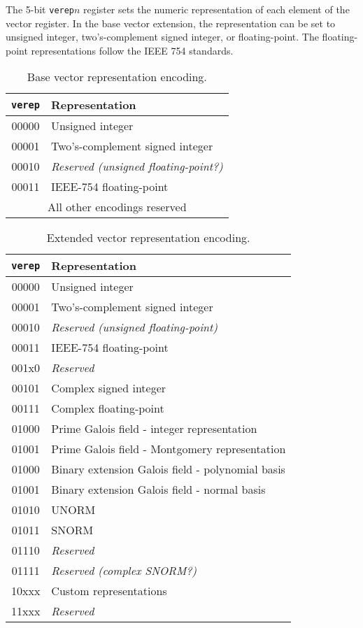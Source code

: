 The 5-bit {\tt verep}$n$ register sets the numeric representation of
each element of the vector register.  In the base vector
extension, the representation can be set to unsigned integer,
two's-complement signed integer, or floating-point.  The
floating-point representations follow the IEEE 754 standards.

\begin{table}[hbtp]
  \centering
  \begin{tabular}{|c|l|}
    \hline
    {\tt verep} & Representation \\
    \hline
    00000 & Unsigned integer \\
    00001 & Two's-complement signed integer \\
    00010 & {\em Reserved (unsigned floating-point?)}\\
    00011 & IEEE-754 floating-point \\
    \hline
    \multicolumn{2}{|c|}{All other encodings reserved}\\
    \hline
  \end{tabular}
  \caption{Base vector representation encoding.}
  \label{tab:verep}
\end{table}

\begin{table}[hbtp]
  \centering
  \begin{tabular}{|c|l|}
    \hline
    {\tt verep} & Representation \\
    \hline
    00000 & Unsigned integer \\
    00001 & Two's-complement signed integer \\
    00010 & {\em Reserved (unsigned floating-point)}\\
    00011 & IEEE-754 floating-point \\
    \hline
    001x0 & {\em Reserved} \\
    00101 & Complex signed integer \\
    00111 & Complex floating-point \\
    \hline
    01000 & Prime Galois field - integer representation \\
    01001 & Prime Galois field - Montgomery representation \\
    01000 & Binary extension Galois field - polynomial basis \\
    01001 & Binary extension Galois field - normal basis \\
    \hline
    01010 & UNORM \\
    01011 & SNORM \\
    01110 & {\em Reserved} \\
    01111 & {\em Reserved (complex SNORM?)} \\
    \hline
    10xxx & Custom representations \\
    \hline
    11xxx & {\em Reserved} \\
    \hline
  \end{tabular}
  \caption{Extended vector representation encoding.}
  \label{tab:extverep}
\end{table}

